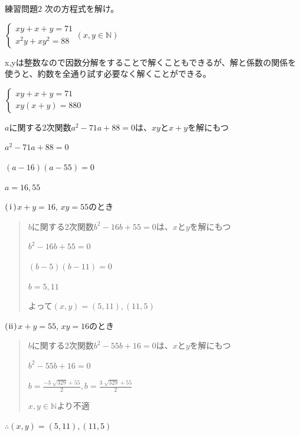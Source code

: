 \documentclass[uplatex,fleqn]{jsbook}
\begin{document}
\begin{problem}{練習問題2}
    次の方程式を解け。

    \begin{math}
        \begin{cases}
            xy+x+y=71\\
            x^2y+xy^2=88
        \end{cases}
        \left(x,y\in\mathbb{N}\right)
    \end{math}
\end{problem}

\begin{answer}
    x,yは整数なので因数分解をすることで解くこともできるが、解と係数の関係を使うと、約数を全通り試す必要なく解くことができる。

    \begin{math}
        \begin{cases}
            xy+x+y=71\\
            xy\left(x+y\right)=880
        \end{cases}
    \end{math}

    $a$に関する2次関数$a^2-71a+88=0$は、$xy$と$x+y$を解にもつ

    $a^2-71a+88=0$

    $\left(a-16\right)\left(a-55\right)=0$

    $a=16,55$

    $\rm\left(\hspace{.18em}i\hspace{.18em}\right)$$x+y=16$, $xy=55$のとき

    \begin{quote}
        $b$に関する2次関数$b^2-16b+55=0$は、$x$と$y$を解にもつ

        $b^2-16b+55=0$

        $\left(b-5\right)\left(b-11\right)=0$

        $b=5,11$

        よって$\left(x,y\right)=\left(5,11\right),\left(11,5\right)$
    \end{quote}

    $\rm\left(\hspace{.08em}ii\hspace{.08em}\right)$$x+y=55$, $xy=16$のとき
    \begin{quote}
        $b$に関する2次関数$b^2-55b+16=0$は、$x$と$y$を解にもつ

        $b^2-55b+16=0$

        $\displaystyle b=\frac{-3 \; \sqrt{329} + 55}{2}, b=\frac{3 \; \sqrt{329} + 55}{2}$

        $x,y\in\mathbb{N}$より不適
    \end{quote}

    $\therefore \left(x,y\right)=\left(5,11\right),\left(11,5\right)$
\end{answer}
\end{document}
